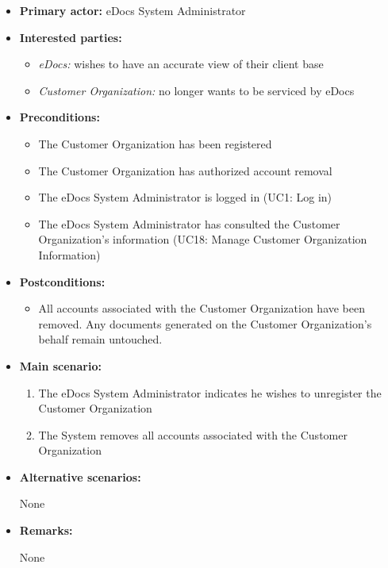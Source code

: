 \documentclass[a4paper,10pt]{article}
\begin{document}
\begin{itemize}
	\item \textbf{Primary actor:} eDocs System Administrator
	\item \textbf{Interested parties:} 
	\begin{itemize}
		\item \textit{eDocs:} wishes to have an accurate view of their client base
		\item \textit{Customer Organization:} no longer wants to be serviced by eDocs
	\end{itemize}
	
	\item \textbf{Preconditions:}
	\begin{itemize}
		\item The Customer Organization has been registered
		\item The Customer Organization has authorized account removal
		\item The eDocs System Administrator is logged in (UC1: Log in)
		\item The eDocs System Administrator has consulted the Customer Organization's information (UC18: Manage Customer Organization Information)
	\end{itemize}
	
	\item \textbf{Postconditions:}
	\begin{itemize}
		\item All accounts associated with the Customer Organization have been removed. Any documents generated on the Customer Organization's behalf remain untouched.
	\end{itemize}
	
	\item \textbf{Main scenario:} 
	\begin{enumerate}
		\item The eDocs System Administrator indicates he wishes to unregister the Customer Organization
		\item The System removes all accounts associated with the Customer Organization
	\end{enumerate}
	
	\item \textbf{Alternative scenarios:} 
	\begin{enumerate}
		None
	\end{enumerate}
	
	\item \textbf{Remarks:}
	\begin{itemize}
		None
	\end{itemize}
\end{itemize}
\end{document}
